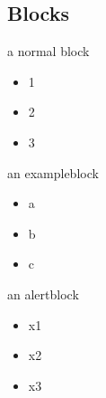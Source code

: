 \documentclass{beamer}
\begin{document}
\subsection{Blocks}
\begin{frame}
    \begin{block}{a normal block}
        \begin{itemize}
            \item 1
            \item 2
            \item 3
        \end{itemize} 
    \end{block}
\end{frame}

\begin{frame}
    \begin{exampleblock}{an exampleblock}
        \begin{itemize}
            \item a
            \item b
            \item c
        \end{itemize} 
    \end{exampleblock}
\end{frame}

\begin{frame}
    \begin{alertblock}{an alertblock}
        \begin{itemize}
            \item x1
            \item x2
            \item x3
        \end{itemize} 
    \end{alertblock}
\end{frame}
\end{document}
